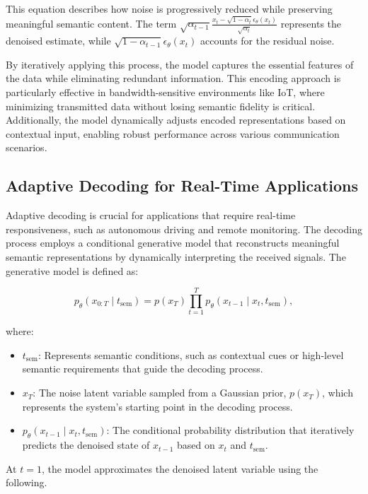 \documentclass[journal]{IEEEtran}
\begin{document}
This equation describes how noise is progressively reduced while preserving meaningful semantic content. The term \( \sqrt{\alpha_{t-1}} \frac{x_t - \sqrt{1 - \alpha_t} \epsilon_\theta (x_t)}{\sqrt{\alpha_t}} \) represents the denoised estimate, while \( \sqrt{1 - \alpha_{t-1}} \epsilon_\theta (x_t) \) accounts for the residual noise.

By iteratively applying this process, the model captures the essential features of the data while eliminating redundant information. This encoding approach is particularly effective in bandwidth-sensitive environments like IoT, where minimizing transmitted data without losing semantic fidelity is critical. Additionally, the model dynamically adjusts encoded representations based on contextual input, enabling robust performance across various communication scenarios.

\subsection{Adaptive Decoding for Real-Time Applications}
Adaptive decoding is crucial for applications that require real-time responsiveness, such as autonomous driving and remote monitoring. The decoding process employs a conditional generative model that reconstructs meaningful semantic representations by dynamically interpreting the received signals. The generative model is defined as:

\begin{equation}
p_\theta(x_{0:T} \mid t_{\text{sem}}) = p(x_T) \prod_{t=1}^T p_\theta(x_{t-1} \mid x_t, t_{\text{sem}}),
\end{equation}

where:
\begin{itemize}
    \item \( t_{\text{sem}} \): Represents semantic conditions, such as contextual cues or high-level semantic requirements that guide the decoding process.
    \item \( x_T \): The noise latent variable sampled from a Gaussian prior, \( p(x_T) \), which represents the system’s starting point in the decoding process.
    \item \( p_\theta(x_{t-1} \mid x_t, t_{\text{sem}}) \): The conditional probability distribution that iteratively predicts the denoised state of \( x_{t-1} \) based on \( x_t \) and \( t_{\text{sem}} \).
\end{itemize}

At \( t=1 \), the model approximates the denoised latent variable using the following.
\end{document}
